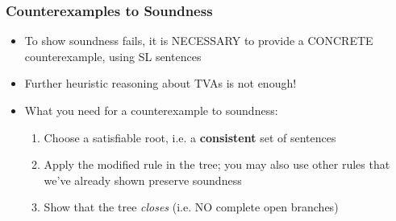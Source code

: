 \begin{frame}
\frametitle{Counterexamples to Soundness}

\begin{itemize}[<+->]

\item To show soundness fails, it is NECESSARY to provide a CONCRETE counterexample, using SL sentences

\bi

\item Further heuristic reasoning about TVAs is not enough!

\ei

\bigskip

\item What you need for a counterexample to soundness:

\begin{enumerate}[1.)]

\item Choose a satisfiable root, i.e. a \textbf{\textcolor{OGlyallpink}{consistent}} set of sentences

\item Apply the modified rule in the tree; you may also use other rules that we've already shown preserve soundness

\item Show that the tree \emph{closes} (i.e. NO \textcolor{OGlyallpink}{complete open branches})

\end{enumerate}

\end{itemize}
\end{frame}



